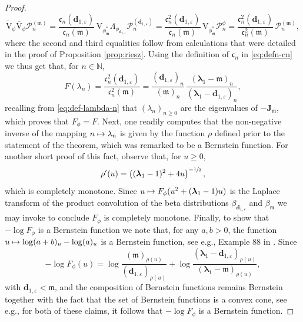 \documentclass[11pt]{article}
\newcommand{\eg}{e.g.,\xspace}
\numberwithin{equation}{section}
\let\epsilon\varepsilon
\newcommand\mto{\mathchoice{\longmapsto}{\mapsto}{\mapsto}{\mapsto}}
\theoremstyle{plain}
\theoremstyle{definition}
\newcommand{\N}{\mathbb{N}}
\renewcommand{\P}{\mathcal{P}}
\newcommand{\calJd}{\mathbf{J}}
\newcommand{\m}{\mathfrak{m}}
\newcommand{\dz}{{\bm{d}}_{1,\epsilon}}
\newcommand{\lam}{{\bm{\lambda}_1}}
\newcommand{\phm}{{\phi_\m^*}}
\newcommand{\gab}[1][\lam,\mo]{{\beta_{#1}}}
\let\mo\mu
\begin{document}
\begin{proof}
\begin{equation*}
\widetilde{\mathrm{V}}_{\phi}\overline{\mathrm{V}}_{\phi} \P_n^{(\m)} = \frac{\mathfrak{c}_n(\dz)}{\mathfrak{c}_n(\m)}\, \mathrm{V}_{\phm} \Lambda_{\phi_{\dz}} \P_n^{(\dz)} = \frac{\mathfrak{c}_n^2(\dz)}{\mathfrak{c}_n(\m)}\, \mathrm{V}_{\phm} \P_n^\phi = \frac{\mathfrak{c}_n^2(\dz)}{\mathfrak{c}_n^2(\m)}\, \P_n^{(\m)},
\end{equation*}
where the second and third equalities follow from calculations that were detailed in the proof of Proposition \ref{prop:riesz}. Using the definition of $\mathfrak{c}_n$ in \eqref{eq:defn-cn} we thus get that, for $n \in \N$,
\begin{equation*}
F(\lambda_n) = \frac{\mathfrak{c}_n^2(\dz)}{\mathfrak{c}_n^2(\m)} = \frac{(\dz)_n}{(\m)_n}\, \frac{(\lam-\m)_n}{(\lam-\dz)_n},
\end{equation*}
recalling from \eqref{eq:def-lambda-n} that $(\lambda_n)_{n \geq 0}$ are the eigenvalues of $-\calJd_{\m}$, which proves that $F_\phi = F$. Next, one readily computes that the non-negative inverse of the mapping $n \mto \lambda_n$ is given by the function $\rho$ defined prior to the statement of the theorem, which was remarked to be a Bernstein function. For another short proof of this fact, observe that, for $u \geq 0$,
\begin{equation*}
\rho'(u) = \left((\lam-1)^2+4u\right)^{-\sfrac{1}{2}},
\end{equation*}
which is completely monotone. Since $u \mto F_\phi(u^2+(\lam-1)u)$ is the Laplace transform of the product convolution of the beta distributions $\gab[\dz]$ and $\gab[\m]$ we may invoke \cite[Th.\,3.7]{SchillingSongVondracek10} to conclude $F_\phi$ is completely monotone. Finally, to show that $-\log F_\phi$ is a Bernstein function we note that, for any $a, b > 0$, the function $u \mto \log (a+b)_u - \log (a)_u$ is a Bernstein function, see \eg Example 88 in \cite[Chap.\,16]{SchillingSongVondracek10}. Since
\begin{equation*}
-\log F_\phi(u) = \log \frac{(\m)_{\rho(u)}}{(\dz)_{\rho(u)}} + \log \frac{(\lam-\dz)_{\rho(u)}}{(\lam-\m)_{\rho(u)}},
\end{equation*}
with $\dz < \m$, and the composition of Bernstein functions remains Bernstein together with the fact that the set of Bernstein functions is a convex cone, see \eg \cite[Cor.\,3.8]{SchillingSongVondracek10} for both of these claims, it follows that $-\log F_\phi$ is a Bernstein function.
\end{proof}
\end{document}

